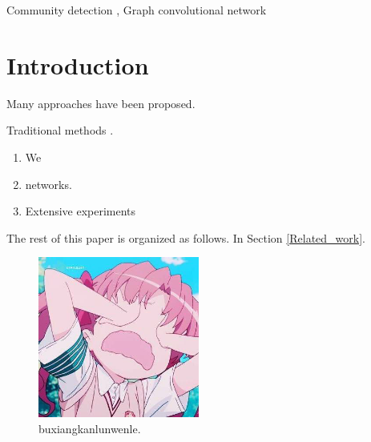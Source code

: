 \documentclass[a4paper,fleqn]{cas-dc}
\begin{document}
\begin{sloppypar}
	\begin{keywords}
		Community detection \sep
		Graph convolutional network 
	\end{keywords}

	\maketitle

	\section{Introduction}

	\par{
		Many approaches have been proposed.
	}

	\par{
		Traditional methods \citep{9732192}.
	}



	\begin{enumerate}[(1)]
		\item We 
		\item networks.
		\item Extensive experiments
	\end{enumerate}

	\par{
		The rest of this paper is organized as follows. In Section \ref{Related_work}.
	}


	\begin{figure}[h] %
		\centering %
		\includegraphics[width=0.9\linewidth]{./123.png}%
		\caption{buxiangkanlunwenle.} %
		\label{FIG:1} %
	\end{figure}



\end{sloppypar}
\end{document}
